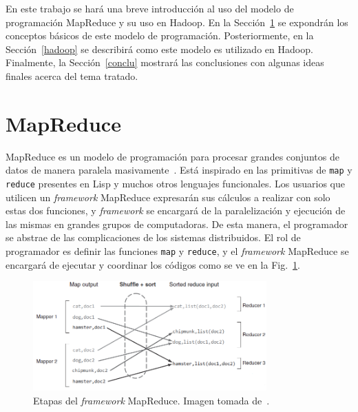 \documentclass[conference]{IEEEtran}
\begin{document}
En este trabajo se hará una breve introducción al uso del modelo de programación MapReduce y su uso en Hadoop.
En la Sección~\ref{map} se expondrán los conceptos básicos de este modelo de programación.
Posteriormente, en la Sección~\ref{hadoop} se describirá como este modelo es utilizado en Hadoop.
Finalmente, la Sección~\ref{conclu} mostrará las conclusiones con algunas ideas finales acerca del tema tratado.






\cite{MapReduceII08}
\cite{BigTable08}
\cite{HDFS10}



\section{MapReduce}
\label{map}

MapReduce es un modelo de programación para procesar grandes conjuntos de datos de manera paralela masivamente~\cite{MapReduce04}.
Está inspirado en las primitivas de \texttt{map} y \texttt{reduce} presentes en Lisp y muchos otros lenguajes funcionales.
Los usuarios que utilicen un \textit{framework} MapReduce expresarán sus cálculos a realizar con solo estas dos funciones, y \textit{framework} se encargará de la paralelización y ejecución de las mismas en grandes grupos de computadoras.
De esta manera, el programador se abstrae de las complicaciones de los sistemas distribuidos. 
El rol de programador es definir las funciones \texttt{map} y \texttt{reduce}, y el \textit{framework} MapReduce se encargará de ejecutar y coordinar los códigos como se ve en la Fig.~\ref{mapreduce}.




\begin{figure}[htbp!]
\centering
\includegraphics[width=0.8\textwidth]{images/mapreduce.png}
\caption{Etapas del \textit{framework} MapReduce. Imagen tomada de~\cite{Holmes12}.}
\label{mapreduce}
\end{figure}
\end{document}
